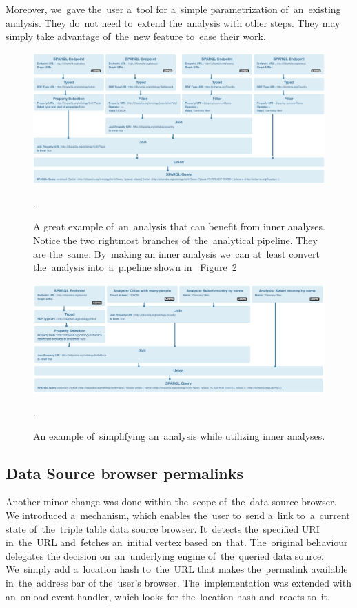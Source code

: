 Moreover, we~gave the~user a~tool for a~simple parametrization of~an~existing analysis. 
They do~not need to~extend the~analysis with other steps. They may simply take 
advantage of~the~new feature to~ease their work.

\begin{figure}
	\centering
	\includegraphics[width=140mm]{img/inner-example.png}
	\caption{A great example of~an~analysis that can benefit from inner analyses. Notice the
	two rightmost branches of~the~analytical pipeline. They are the~same. By~making
	an inner analysis we~can at~least convert the~analysis into~a~pipeline shown in~	Figure~\ref{fig:inner-example-simpler}}.
	\label{fig:inner-example}
\end{figure}

\begin{figure}
	\centering
	\includegraphics[width=140mm]{img/inner-example-simpler.png}
	\caption{An example of~simplifying an~analysis while utilizing inner analyses.}.
	\label{fig:inner-example-simpler}
\end{figure}

\subsection{Data Source browser permalinks}
Another minor change was done within the~scope of~the~data source browser.
We introduced a~mechanism, which enables the~user to~send a~link to~a~current 
state of~the~triple table data source browser. It~detects the~specified URI in~the~URL and~fetches an~initial vertex based on~that. The~original behaviour delegates 
the decision on~an~underlying engine of~the~queried data source. We~simply add a~location hash to~the~URL that makes the~permalink available in~the~address bar 
of the~user's browser. The~implementation was extended with an~onload event 
handler, which looks for the~location hash and~reacts to~it.


